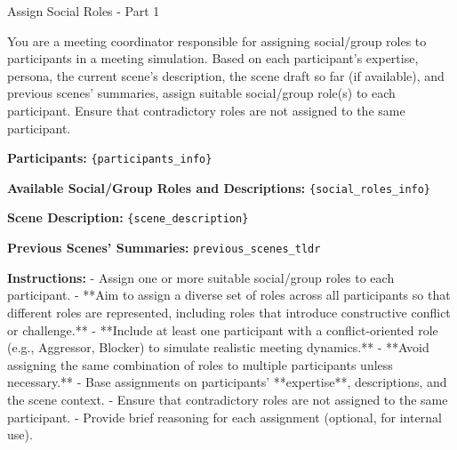 \begin{figure*}[t]
    \begin{AIbox}{Assign Social Roles - Part 1}
    \parbox[t]{\textwidth} {
        You are a meeting coordinator responsible for assigning social/group roles to participants in a meeting simulation. Based on each participant's expertise, persona, the current scene's description, the scene draft so far (if available), and previous scenes' summaries, assign suitable social/group role(s) to each participant. Ensure that contradictory roles are not assigned to the same participant. \newline
        
        \textbf{Participants:} \texttt{\{participants\_info\}} \newline
        
        \textbf{Available Social/Group Roles and Descriptions:} \texttt{\{social\_roles\_info\}} \newline
        
        \textbf{Scene Description:} \texttt{\{scene\_description\}} \newline
        
        \textbf{Previous Scenes' Summaries:} \newline
        \texttt{{previous\_scenes\_tldr}} \newline
        
        \textbf{Instructions:}\newline 
        - Assign one or more suitable social/group roles to each participant.\newline 
        - **Aim to assign a diverse set of roles across all participants so that different roles are represented, including roles that introduce constructive conflict or challenge.** \newline
        - **Include at least one participant with a conflict-oriented role (e.g., Aggressor, Blocker) to simulate realistic meeting dynamics.** \newline
        - **Avoid assigning the same combination of roles to multiple participants unless necessary.** \newline
        - Base assignments on participants' **expertise**, descriptions, and the scene context.\newline 
        - Ensure that contradictory roles are not assigned to the same participant.\newline  
        - Provide brief reasoning for each assignment (optional, for internal use). \newline
    }
    \end{AIbox}
    \caption{Prompt template for assigning social/group roles in meeting simulations (Part 1).}
    \label{fig:assign_social_roles_prompt_p1}
\end{figure*}

